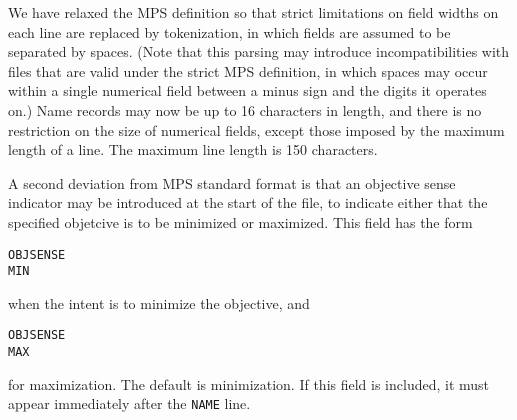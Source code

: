 We have relaxed the MPS definition so that strict limitations on field
widths on each line are replaced by tokenization, in which fields are
assumed to be separated by spaces.  (Note that this parsing may
introduce incompatibilities with files that are valid under the strict
MPS definition, in which spaces may occur within a single numerical
field between a minus sign and the digits it operates on.) Name
records may now be up to 16 characters in length, and there is no
restriction on the size of numerical fields, except those imposed by
the maximum length of a line. The maximum line length is 150
characters.

A second deviation from MPS standard format is that an objective sense
indicator may be introduced at the start of the file, to indicate
either that the specified objetcive is to be minimized or maximized.
This field has the form
\begin{verbatim}
OBJSENSE
MIN
\end{verbatim}
when the intent is to minimize the objective, and
\begin{verbatim}
OBJSENSE
MAX
\end{verbatim}
for maximization. The default is minimization. If this field is
included, it must appear immediately after the \texttt{NAME} line.


